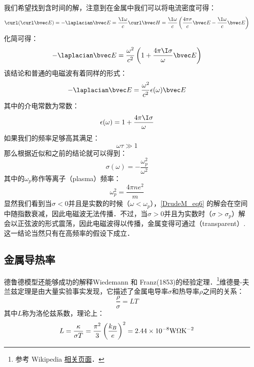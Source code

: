 我们希望找到含时间的解，注意到在金属中我们可以将电流密度可得：
\begin{equation}
\curl(\curl\bvec E)=-\laplacian \bvec E =\frac{\I\omega}{c}\curl\bvec H=\frac{\I\omega}{c}\left(\frac{4\pi\sigma}{c}\bvec E-\frac{\I\omega}{c}\bvec E\right)
\end{equation}
化简可得：
\begin{equation}
-\laplacian \bvec E =\frac{\omega^2}{c^2}\left(1+\frac{4\pi\I\sigma}{\omega}\bvec E\right)
\end{equation}
该结论和普通的电磁波有着同样的形式：
\begin{equation}\label{DrudeM_eq6}
-\laplacian \bvec E = \frac{\omega^2}{c^2}\epsilon(\omega)\bvec E
\end{equation}
其中的介电常数为常数：
\begin{equation}
\epsilon(\omega)=1+\frac{4\pi\I\sigma}{\omega}
\end{equation}
如果我们的频率足够高其满足：
\begin{equation}
\omega\tau\gg 1
\end{equation}
那么根据近似和之前的结论就可以得到：
\begin{equation}
\sigma(\omega)=-\frac{\omega_p^2}{\omega^2}
\end{equation}
其中的$\omega_p$称作等离子（plasma）频率：
\begin{equation}
\omega_p^2=\frac{4\pi ne^2}{m}
\end{equation}
显然我们看到当$\sigma<0$并且是实数的时候（$\omega<\omega_p$），\autoref{DrudeM_eq6} 的解会在空间中随指数衰减，因此电磁波无法传播．不过，当$\sigma>0$并且为实数时（$\sigma>\sigma_p$）解会以正弦波的形式震荡，因此电磁波得以传播，金属变得可通过（transparent）.这一结论当然只有在高频率的假设下成立．

\subsection{金属导热率}
德鲁德模型还能够成功的解释Wiedemann 和 Franz(1853)的经验定理．\footnote{参考 Wikipedia \href{https://en.wikipedia.org/wiki/Wiedemann%E2%80%93Franz_law}{相关页面}．}维德曼-夫兰兹定理是由大量实验事实发现，它描述了金属电导率$\sigma$和热导率$\rho$之间的关系：
\begin{equation}
\frac{\rho}{\sigma}=LT
\end{equation}
其中$L$称为洛伦兹系数，理论上：
\begin{equation}
L=\frac{\kappa}{\sigma T}=\frac{\pi^2}{3}\left(\frac{k_B}{e}\right)^2 = 2.44\times10^{-8}\rm{W\Omega K^{-2}}
\end{equation}

